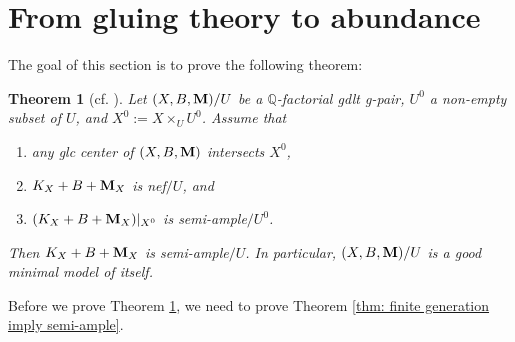 \documentclass[11pt]{amsart}
\numberwithin{equation}{section}
\newcommand{\Mm}{{\bf{M}}}
\newtheorem{thm}{Theorem}[section]
\theoremstyle{definition}
\theoremstyle{definition}
\theoremstyle{definition}
\begin{document}
\section{From gluing theory to abundance}\label{sec: key theorem}
The goal of this section is to prove the following theorem: 

\begin{thm}[{cf. \cite[Theorem 4.1]{HX13}}]\label{thm: semi-ample over U0 implies semi-ample over U}
Let $(X,B,\Mm)/U$ be a $\mathbb Q$-factorial gdlt g-pair, $U^0$ a non-empty subset of $U$, and $X^0:=X\times_UU^0$. Assume that
\begin{enumerate}
    \item any glc center of $(X,B,\Mm)$ intersects $X^0$,
    \item $K_X+B+\Mm_X$ is nef$/U$, and
    \item $(K_X+B+\Mm_X)|_{X^0}$ is semi-ample$/U^0$.
\end{enumerate}
Then $K_X+B+\Mm_X$ is semi-ample$/U$. In particular, $(X,B,\Mm)/U$ is a good minimal model of itself.
\end{thm}

Before we prove Theorem \ref{thm: semi-ample over U0 implies semi-ample over U}, we need to prove Theorem \ref{thm: finite generation imply semi-ample}.
\end{document}

